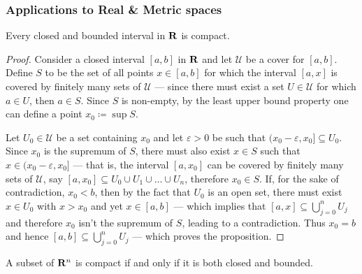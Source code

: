 \subsubsection{Applications to Real \& Metric spaces}

\begin{lemma}
\label{lem:closed-interval-is-compact}
Every closed and bounded interval in \(\mathbf{R}\) is compact.
\end{lemma}

\begin{proof}
Consider a closed interval \([a, b]\) in \(\mathbf{R}\) and let \(\mathcal{U}\) be a
cover for \([a, b]\). Define \(S\) to be the set of all points \(x \in [a, b]\)
for which the interval \([a, x]\) is covered by finitely many sets of
\(\mathcal{U}\) --- since there must exist a set \(U \in \mathcal{U}\) for
which \(a \in U\), then \(a \in S\). Since \(S\) is non-empty, by the
least upper bound property one can define a point \(x_0 \coloneq \sup S\).

Let \(U_0 \in \mathcal{U}\) be a set containing \(x_0\) and let
\(\varepsilon > 0\) be such that \((x_0 - \varepsilon, x_0] \subseteq
U_0\). Since \(x_0\) is the supremum of \(S\), there must also exist \(x \in S\)
such that \(x \in (x_0 - \varepsilon, x_0]\) --- that is, the interval
\([a, x_0]\) can be covered by finitely many sets of \(\mathcal{U}\), say
\([a, x_0] \subseteq U_0 \cup U_1 \cup \dots \cup U_n\), therefore
\(x_0 \in S\). If, for the sake of contradiction, \(x_0 < b\), then by the fact
that \(U_0\) is an open set, there must exist \(x \in U_0\) with \(x > x_0\) and
yet \(x \in [a, b]\) --- which implies that
\([a, x] \subseteq \bigcup_{j=0}^n U_j\) and therefore \(x_0\)
isn't the supremum of \(S\), leading to a contradiction. Thus \(x_0 = b\) and
hence \([a, b] \subseteq \bigcup_{j=0}^n U_j\) --- which proves the
proposition.
\end{proof}

\begin{corollary}
\label{cor:heine-borel}
A subset of \(\mathbf{R}^n\) is compact if and only if it is both closed and bounded.
\end{corollary}

